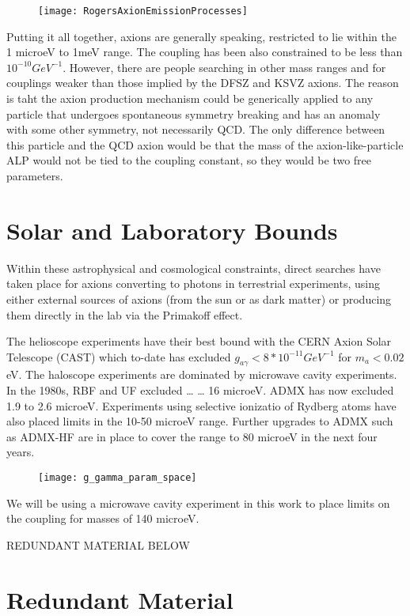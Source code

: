 \documentclass[12pt, twoside]{book}
\begin{document}
\begin{figure}
\texttt{[image: RogersAxionEmissionProcesses]}
\end{figure}

Putting it all together, axions are generally speaking, restricted to lie within the 1 microeV to 1meV range. The coupling has been also constrained to be less than $10^{-10} GeV^{-1}$. However, there are people searching in other mass ranges and for couplings weaker than those implied by the DFSZ and KSVZ axions. The reason is taht the axion production mechanism could be generically applied to any particle that undergoes spontaneous symmetry breaking and has an anomaly with some other symmetry, not necessarily QCD. The only difference between this particle and the QCD axion would be that the mass of the axion-like-particle ALP would not be tied to the coupling constant, so they would be two free parameters. 


\section{Solar and Laboratory Bounds}

Within these astrophysical and cosmological constraints, direct searches have taken place for axions converting to photons in terrestrial experiments, using either external sources of axions (from the sun or as dark matter) or producing them directly in the lab via the Primakoff effect.

The helioscope experiments have their best bound with the CERN Axion Solar Telescope (CAST) which to-date has excluded $g_{a\gamma} < 8 * 10^{-11} GeV^{-1}$ for $m_a < 0.02$ eV. The haloscope experiments are dominated by microwave cavity experiments. In the 1980s, RBF and UF excluded … … 16 microeV. ADMX has now excluded 1.9 to 2.6 microeV. Experiments using selective ionizatio of Rydberg atoms have also placed limits in the 10-50 microeV range. Further upgrades to ADMX such as ADMX-HF are in place to cover the range to 80 microeV in the next four years.

\begin{figure}
\texttt{[image: g\_gamma\_param\_space]}
\end{figure}

We will be using a microwave cavity experiment in this work to place limits on the coupling for masses of 140 microeV.

{\color{blue} REDUNDANT MATERIAL BELOW}

\section{Redundant Material}
\end{document}
